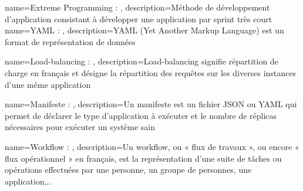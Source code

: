 {
    name=Extreme Programming : ,
    description={Méthode de développement d'application consistant à développer une application par sprint très court}
}
{
    name=YAML : ,
    description={YAML (Yet Another Markup Language) est un format de représentation de données}
}

{
    name=Load-balancing : ,
    description={Load-balancing signifie répartition de charge en français et désigne la répartition des requêtes sur les diverses instances d'une même application}
}

{
    name=Manifeste : ,
    description={Un manifeste est un fichier JSON ou YAML qui permet de déclarer le type d'application à exécuter et le nombre de réplicas nécessaires pour exécuter un système sain}
}

{
    name=Workflow : ,
    description={Un workflow, ou « flux de travaux », ou encore « flux opérationnel » en français, est la représentation d'une suite de tâches ou opérations effectuées par une personne, un groupe de personnes, une application,..}
}